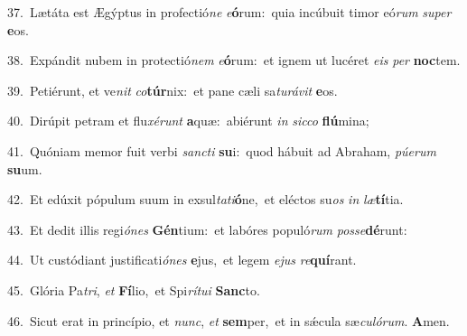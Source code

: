 {\numbfont\textcolor{\numbcolor}{37.}}~Lætáta est Ægýptus in profectió\textit{ne} \textit{e}\-\textbf{ó}rum:~\star quia incúbuit timor eó\textit{rum} \textit{su}\-\textit{per} \textbf{e}\-os.\par
{\numbfont\textcolor{\numbcolor}{38.}}~Expándit nubem in protectió\textit{nem} \textit{e}\-\textbf{ó}rum:~\star et ignem ut lucéret \textit{e}\-\textit{is} \textit{per} \textbf{noc}\-tem.\par
{\numbfont\textcolor{\numbcolor}{39.}}~Petiérunt, et ve\textit{nit} \textit{co}\-\textbf{túr}nix:~\star et pane cæli sa\-\textit{tu}\-\textit{rá}\textit{vit} \textbf{e}\-os.\par
{\numbfont\textcolor{\numbcolor}{40.}}~Dirúpit petram et flu\-\textit{xé}\-\textit{runt} \textbf{a}\-quæ:~\star abiérunt \textit{in} \textit{sic}\-\textit{co} \textbf{flú}\-mina;\par
{\numbfont\textcolor{\numbcolor}{41.}}~Quóniam memor fuit verbi \textit{sanc}\-\textit{ti} \textbf{su}\-i:~\star quod hábuit ad Abraham, \textit{pú}\-\textit{e}\textit{rum} \textbf{su}\-um.\par
{\numbfont\textcolor{\numbcolor}{42.}}~Et edúxit pópulum suum in exsul\-\textit{ta}\-\textit{ti}\textbf{ó}ne,~\star et eléctos su\textit{os} \textit{in} \textit{læ}\-\textbf{tí}tia.\par
{\numbfont\textcolor{\numbcolor}{43.}}~Et dedit illis regi\-\textit{ó}\-\textit{nes} \textbf{Gén}\-tium:~\star et labóres populó\textit{rum} \textit{pos}\-\textit{se}\textbf{dé}runt:\par
{\numbfont\textcolor{\numbcolor}{44.}}~Ut custódiant justificati\-\textit{ó}\-\textit{nes} \textbf{e}\-jus,~\star et legem \textit{e}\-\textit{jus} \textit{re}\-\textbf{quí}rant.\par
{\numbfont\textcolor{\numbcolor}{45.}}~Glória Pa\-\textit{tri}\-, \textit{et} \textbf{Fí}\-lio,~\star et Spi\-\textit{rí}\-\textit{tu}\textit{i} \textbf{Sanc}\-to.\par
{\numbfont\textcolor{\numbcolor}{46.}}~Sicut erat in princípio, et \textit{nunc}\-, \textit{et} \textbf{sem}\-per,~\star et in sǽcula sæ\-\textit{cu}\-\textit{ló}\textit{rum}. \textbf{A}\-men.\par
